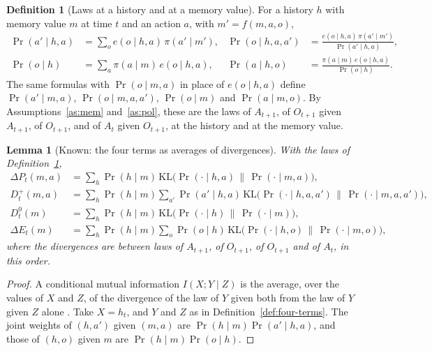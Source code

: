 \documentclass{article}
\newtheorem{lemma}[proposition]{Lemma}
\theoremstyle{definition}
\newtheorem{definition}[proposition]{Definition}
\newcommand{\KL}{\mathrm{KL}}
\newcommand{\dE}{\Delta E}
\newcommand{\dP}{\Delta P}
\begin{document}
\begin{definition}[Laws at a history and at a memory value]\label{def:laws}
For a history $h$ with memory value $m$ at time $t$ and an action $a$, with $m'=f(m,a,o)$,
\begin{align*}
\Pr(a'\mid h,a)&=\sum_oe(o\mid h,a)\,\pi(a'\mid m'), &
\Pr(o\mid h,a,a')&=\frac{e(o\mid h,a)\,\pi(a'\mid m')}{\Pr(a'\mid h,a)},\\
\Pr(o\mid h)&=\sum_a\pi(a\mid m)\,e(o\mid h,a), &
\Pr(a\mid h,o)&=\frac{\pi(a\mid m)\,e(o\mid h,a)}{\Pr(o\mid h)}.
\end{align*}
The same formulas with $\Pr(o\mid m,a)$ in place of $e(o\mid h,a)$ define $\Pr(a'\mid m,a)$, $\Pr(o\mid m,a,a')$, $\Pr(o\mid m)$ and $\Pr(a\mid m,o)$. By Assumptions~\ref{as:mem} and~\ref{as:pol}, these are the laws of $A_{t+1}$, of $O_{t+1}$ given $A_{t+1}$, of $O_{t+1}$, and of $A_t$ given $O_{t+1}$, at the history and at the memory value.
\end{definition}

\begin{lemma}[Known: the four terms as averages of divergences]\label{lem:klforms}
With the laws of Definition~\ref{def:laws},
\begin{align*}
\dP_t(m,a)&=\sum_h\Pr(h\mid m)\,\KL\big(\Pr(\cdot\mid h,a)\,\big\|\,\Pr(\cdot\mid m,a)\big),\\
D^+_t(m,a)&=\sum_h\Pr(h\mid m)\sum_{a'}\Pr(a'\mid h,a)\,\KL\big(\Pr(\cdot\mid h,a,a')\,\big\|\,\Pr(\cdot\mid m,a,a')\big),\\
D^0_t(m)&=\sum_h\Pr(h\mid m)\,\KL\big(\Pr(\cdot\mid h)\,\big\|\,\Pr(\cdot\mid m)\big),\\
\dE_t(m)&=\sum_h\Pr(h\mid m)\sum_o\Pr(o\mid h)\,\KL\big(\Pr(\cdot\mid h,o)\,\big\|\,\Pr(\cdot\mid m,o)\big),
\end{align*}
where the divergences are between laws of $A_{t+1}$, of $O_{t+1}$, of $O_{t+1}$ and of $A_t$, in this order.
\end{lemma}

\begin{proof}
A conditional mutual information $I(X;Y\mid Z)$ is the average, over the values of $X$ and $Z$, of the divergence of the law of $Y$ given both from the law of $Y$ given $Z$ alone \citep[Ch.~2]{cover2006elements}. Take $X=h_t$, and $Y$ and $Z$ as in Definition~\ref{def:four-terms}. The joint weights of $(h,a')$ given $(m,a)$ are $\Pr(h\mid m)\Pr(a'\mid h,a)$, and those of $(h,o)$ given $m$ are $\Pr(h\mid m)\Pr(o\mid h)$.
\end{proof}
\end{document}
